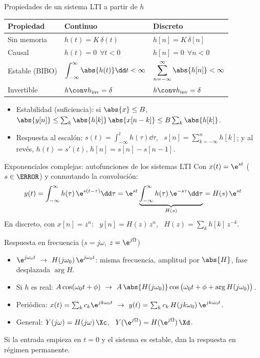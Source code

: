\documentclass[aspectratio=169,11pt]{beamer}
\begin{document}
\begin{frame}{Propiedades de un sistema LTI a partir de $h$}
  \begin{center}
    \renewcommand{\arraystretch}{1.45}
    \begin{tabular}{@{}lll@{}}
      \toprule
      Propiedad & Continuo & Discreto\\\midrule
      Sin memoria & $h(t)=K\,\delta(t)$ & $h[n]=K\,\delta[n]$\\
      Causal & $h(t)=0\ \ \forall t<0$ & $h[n]=0\ \ \forall n<0$\\
      Estable (BIBO) & $\displaystyle\int_{-\infty}^{\infty}\abs{h(t)}\dd t<\infty$ & $\displaystyle\sum_{n=-\infty}^{\infty}\abs{h[n]}<\infty$\\
      Invertible & $h\conv h_{\mathrm{inv}}=\delta$ & $h\conv h_{\mathrm{inv}}=\delta$\\\bottomrule
    \end{tabular}
  \end{center}
  \begin{itemize}\small
    \item Estabilidad (suficiencia): si $\abs{x}\le B$, \ $\abs{y[n]}\le\sum_k\abs{h[k]}\,\abs{x[n-k]}\le B\sum_k\abs{h[k]}$.
    \item Respuesta al escalón: $s(t)=\int_{-\infty}^{t}h(\tau)\dd\tau$, \ $s[n]=\sum_{k=-\infty}^{n}h[k]$; y al revés, $h(t)=s'(t)$, $h[n]=s[n]-s[n-1]$.
  \end{itemize}
\end{frame}

\begin{frame}{Exponenciales complejas: autofunciones de los sistemas LTI}
  Con $x(t)=\e^{st}$ ($s\in\C$) y conmutando la convolución:
  \[
    y(t)=\int_{-\infty}^{\infty}h(\tau)\,\e^{s(t-\tau)}\dd\tau
    =\e^{st}\underbrace{\int_{-\infty}^{\infty}h(\tau)\,\e^{-s\tau}\dd\tau}_{H(s)}
    =H(s)\,\e^{st}
  \]
  En discreto, con $x[n]=z^n$: \ $y[n]=H(z)\,z^n$, \ $H(z)=\sum_k h[k]\,z^{-k}$.
  \begin{block}{Respuesta en frecuencia ($s=j\omega$, $z=\e^{j\Omega}$)}
    \begin{itemize}\small
      \item $\e^{j\omega_0t}\ \to\ H(j\omega_0)\,\e^{j\omega_0t}$: misma frecuencia, amplitud por $\abs{H}$, fase desplazada $\arg H$.
      \item Si $h$ es real: $A\cos(\omega_0t+\phi)\ \to\ A\,\abs{H(j\omega_0)}\cos\big(\omega_0t+\phi+\arg H(j\omega_0)\big)$.
      \item Periódica: $x(t)=\sum_kc_k\e^{jk\omega_0t}\ \to\ y(t)=\sum_kc_k\,H(jk\omega_0)\,\e^{jk\omega_0t}$.
      \item General: $Y(j\omega)=H(j\omega)\,\Xc$, \ $Y(\e^{j\Omega})=H(\e^{j\Omega})\,\Xd$.
    \end{itemize}
  \end{block}
  {\footnotesize\color{pdsgris}Si la entrada empieza en $t=0$ y el sistema es estable, dan la respuesta en régimen permanente.}
\end{frame}
\end{document}
